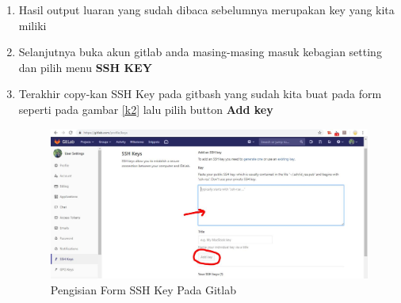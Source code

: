 \begin{enumerate}
\item Hasil output luaran yang sudah dibaca sebelumnya merupakan key yang kita miliki
\item Selanjutnya buka akun gitlab anda masing-masing masuk kebagian setting dan pilih menu \textbf{SSH KEY}
\item Terakhir copy-kan SSH Key pada gitbash yang sudah kita buat pada form seperti pada gambar \ref{k2} lalu pilih button \textbf{Add key}
\subitem
\begin{figure}[!htbp]
\centerline{\includegraphics[width=.75\textwidth]{Figures/gitlab/SettingSSH.JPG}}
\caption{Pengisian Form SSH Key Pada Gitlab}
\label{fig:k2}
\end{figure}
\end{enumerate}